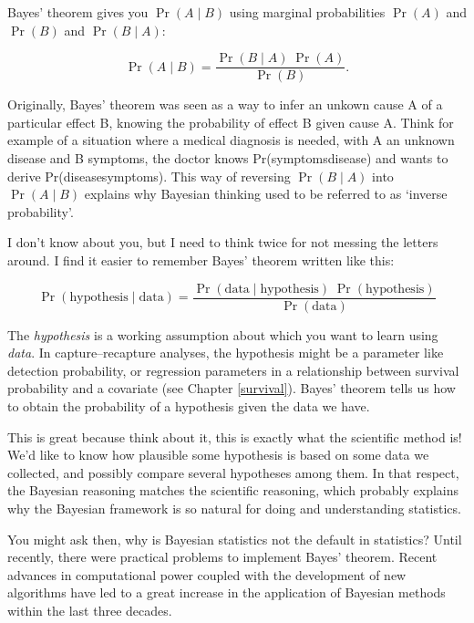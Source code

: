 \documentclass[
  12pt,
]{krantz}
\begin{document}
Bayes' theorem gives you \(\Pr(A \mid B)\) using marginal probabilities \(\Pr(A)\) and \(\Pr(B)\) and \(\Pr(B \mid A)\):

\[\Pr(A \mid B) = \displaystyle{\frac{ \Pr(B \mid A) \; \Pr(A)}{\Pr(B)}}.\]

Originally, Bayes' theorem was seen as a way to infer an unkown cause A of a particular effect B, knowing the probability of effect B given cause A. Think for example of a situation where a medical diagnosis is needed, with A an unknown disease and B symptoms, the doctor knows Pr(symptoms\textbar disease) and wants to derive Pr(disease\textbar symptoms). This way of reversing \(\Pr(B \mid A)\) into \(\Pr(A \mid B)\) explains why Bayesian thinking used to be referred to as `inverse probability'.

I don't know about you, but I need to think twice for not messing the letters around. I find it easier to remember Bayes' theorem written like this:

\[\Pr(\text{hypothesis} \mid \text{data}) = \frac{ \Pr(\text{data} \mid \text{hypothesis}) \; \Pr(\text{hypothesis})}{\Pr(\text{data})}\]

\begin{blackbox}
The \emph{hypothesis} is a working assumption about which you want to learn using \emph{data}. In capture--recapture analyses, the hypothesis might be a parameter like detection probability, or regression parameters in a relationship between survival probability and a covariate (see Chapter \ref{survival}). Bayes' theorem tells us how to obtain the probability of a hypothesis given the data we have.

\end{blackbox}

This is great because think about it, this is exactly what the scientific method is! We'd like to know how plausible some hypothesis is based on some data we collected, and possibly compare several hypotheses among them. In that respect, the Bayesian reasoning matches the scientific reasoning, which probably explains why the Bayesian framework is so natural for doing and understanding statistics.

You might ask then, why is Bayesian statistics not the default in statistics? Until recently, there were practical problems to implement Bayes' theorem. Recent advances in computational power coupled with the development of new algorithms have led to a great increase in the application of Bayesian methods within the last three decades.
\end{document}
